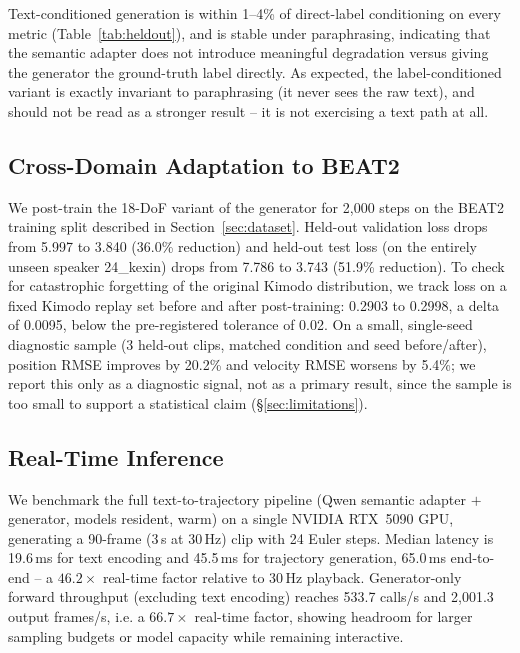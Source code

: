 \documentclass[conference]{IEEEtran}
\begin{document}
Text-conditioned generation is within 1--4\% of direct-label
conditioning on every metric (Table~\ref{tab:heldout}), and is stable
under paraphrasing, indicating that the semantic adapter does not
introduce meaningful degradation versus giving the generator the
ground-truth label directly. As expected, the label-conditioned variant
is exactly invariant to paraphrasing (it never sees the raw text), and
should not be read as a stronger result -- it is not exercising a text
path at all.

\subsection{Cross-Domain Adaptation to BEAT2}
\label{sec:beat2-adapt}

We post-train the 18-DoF variant of the generator for 2{,}000 steps on
the BEAT2 training split described in Section~\ref{sec:dataset}.
Held-out validation loss drops from 5.997 to 3.840 (36.0\% reduction)
and held-out test loss (on the entirely unseen speaker 24\_kexin) drops
from 7.786 to 3.743 (51.9\% reduction). To check for catastrophic
forgetting of the original Kimodo distribution, we track loss on a
fixed Kimodo replay set before and after post-training: 0.2903 to
0.2998, a delta of 0.0095, below the pre-registered tolerance of 0.02.
On a small, single-seed diagnostic sample (3 held-out clips, matched
condition and seed before/after), position RMSE improves by 20.2\% and
velocity RMSE worsens by 5.4\%; we report this only as a diagnostic
signal, not as a primary result, since the sample is too small to
support a statistical claim (\S\ref{sec:limitations}).

\subsection{Real-Time Inference}
\label{sec:realtime}

We benchmark the full text-to-trajectory pipeline (Qwen semantic
adapter $+$ generator, models resident, warm) on a single NVIDIA
RTX~5090 GPU, generating a 90-frame (3\,s at 30\,Hz) clip with 24
Euler steps. Median latency is 19.6\,ms for text encoding and 45.5\,ms
for trajectory generation, 65.0\,ms end-to-end -- a $46.2\times$
real-time factor relative to 30\,Hz playback. Generator-only forward
throughput (excluding text encoding) reaches 533.7 calls/s and
2{,}001.3 output frames/s, i.e. a $66.7\times$ real-time factor,
showing headroom for larger sampling budgets or model capacity while
remaining interactive.
\end{document}
